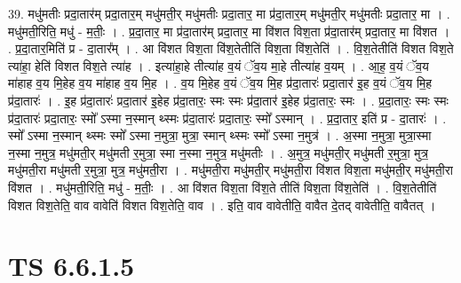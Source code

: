 \documentclass[17pt]{extarticle}
\begin{document}
39. मधु॑मतीः प्रदा॒तार॑म् प्रदा॒तार॒म् मधु॑मती॒र् मधु॑मतीः प्रदा॒तार॒ मा प्र॑दा॒तार॒म् मधु॑मती॒र् मधु॑मतीः प्रदा॒तार॒ मा । . मधु॑मती॒रिति॒ मधु॑ - म॒तीः॒ । . प्र॒दा॒तार॒ मा प्र॑दा॒तार॑म् प्रदा॒तार॒ मा वि॑शत विश॒ता प्र॑दा॒तार॑म् प्रदा॒तार॒ मा वि॑शत । . प्र॒दा॒तार॒मिति॑ प्र - दा॒तार᳚म् । . आ वि॑शत विश॒ता वि॑श॒तेतीति॑ विश॒ता वि॑श॒तेति॑ । . वि॒श॒तेतीति॑ विशत विश॒ते त्या॑हा॒ हेति॑ विशत विश॒ते त्या॑ह । . इत्या॑हा॒हे तीत्या॑ह व॒यं ॅव॒य मा॒हे तीत्या॑ह व॒यम् । . आ॒ह॒ व॒यं ॅव॒य मा॑हाह व॒य मि॒हेह व॒य मा॑हाह व॒य मि॒ह । . व॒य मि॒हेह व॒यं ॅव॒य मि॒ह प्र॑दा॒तारः॑ प्रदा॒तार॑ इ॒ह व॒यं ॅव॒य मि॒ह प्र॑दा॒तारः॑ । . इ॒ह प्र॑दा॒तारः॑ प्रदा॒तार॑ इ॒हेह प्र॑दा॒तारः॒ स्मः स्मः प्र॑दा॒तार॑ इ॒हेह प्र॑दा॒तारः॒ स्मः । . प्र॒दा॒तारः॒ स्मः स्मः प्र॑दा॒तारः॑ प्रदा॒तारः॒ स्मो᳚ ऽस्मा न॒स्मान् थ्स्मः प्र॑दा॒तारः॑ प्रदा॒तारः॒ स्मो᳚ ऽस्मान् । . प्र॒दा॒तार॒ इति॑ प्र - दा॒तारः॑ । . स्मो᳚ ऽस्मा न॒स्मान् थ्स्मः स्मो᳚ ऽस्मा न॒मुत्रा॒ मुत्रा॒ स्मान् थ्स्मः स्मो᳚ ऽस्मा न॒मुत्र॑ । . अ॒स्मा न॒मुत्रा॒ मुत्रा॒स्मा न॒स्मा न॒मुत्र॒ मधु॑मती॒र् मधु॑मती र॒मुत्रा॒ स्मा न॒स्मा न॒मुत्र॒ मधु॑मतीः । . अ॒मुत्र॒ मधु॑मती॒र् मधु॑मती र॒मुत्रा॒ मुत्र॒ मधु॑मती॒रा मधु॑मती र॒मुत्रा॒ मुत्र॒ मधु॑मती॒रा । . मधु॑मती॒रा मधु॑मती॒र् मधु॑मती॒रा वि॑शत विश॒ता मधु॑मती॒र् मधु॑मती॒रा वि॑शत । . मधु॑मती॒रिति॒ मधु॑ - म॒तीः॒ । . आ वि॑शत विश॒ता वि॑श॒ते तीति॑ विश॒ता वि॑श॒तेति॑ । . वि॒श॒तेतीति॑ विशत विश॒तेति॒ वाव वावेति॑ विशत विश॒तेति॒ वाव । . इति॒ वाव वावेतीति॒ वावैत दे॒तद् वावेतीति॒ वावैतत् । \newline
\pagebreak
{}

\section{ TS 6.6.1.5 }
\end{document}
